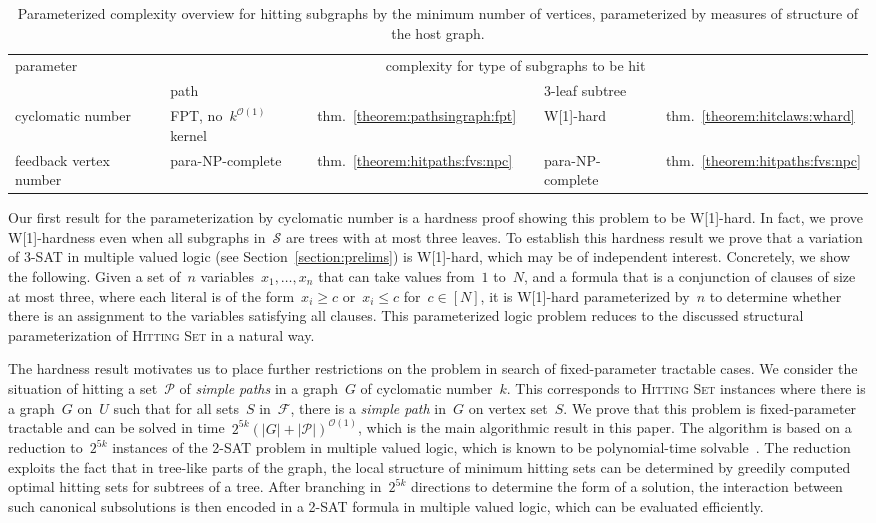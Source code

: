 \let\accentvec\vec  \documentclass{llncs}
\newcommand{\Oh}{{\mathcal{O}}}
\renewcommand{\S}{\ensuremath{\mathcal{S}}\xspace}
\renewcommand{\P}{\ensuremath{\mathcal{P}}\xspace}
\newcommand{\F}{\ensuremath{\mathcal{F}}\xspace}
\newcommand{\HittingSet}{\textsc{Hitting Set}\xspace}
\begin{document}
\begin{table}[t]
	\caption{Parameterized complexity overview for hitting subgraphs by the minimum number of vertices, parameterized by measures of structure of the host graph. }
	\centering
{
\begin{tabular}{@{}llllll@{}}
\toprule
parameter & \multicolumn{5}{c}{complexity for type of subgraphs to be hit} \\ 
\cmidrule{2-6}
& \multicolumn{2}{l}{path} & \phantom{abc} & \multicolumn{2}{l}{3-leaf subtree} \\ 
\midrule
cyclomatic number & FPT, no~$k^{\Oh(1)}$ kernel & thm.~\ref{theorem:pathsingraph:fpt} & & W[1]-hard & thm.~\ref{theorem:hitclaws:whard} \\
feedback vertex number & para-NP-complete & thm.~\ref{theorem:hitpaths:fvs:npc} & & para-NP-complete & thm.~\ref{theorem:hitpaths:fvs:npc} \\
\bottomrule
\end{tabular}
\label{table:summary}
}
\end{table}

Our first result for the parameterization by cyclomatic number is a hardness proof showing this problem to be W[1]-hard. In fact, we prove W[1]-hardness even when all subgraphs in~$\S$ are trees with at most three leaves. To establish this hardness result we prove that a variation of 3-SAT in multiple valued logic (see Section~\ref{section:prelims}) is W[1]-hard, which may be of independent interest. Concretely, we show the following. Given a set of~$n$ variables~$x_1, \ldots, x_n$ that can take values from~$1$ to~$N$, and a formula that is a conjunction of clauses of size at most three, where each literal is of the form~$x_i \geq c$ or~$x_i \leq c$ for~$c \in [N]$, it is W[1]-hard parameterized by~$n$ to determine whether there is an assignment to the variables satisfying all clauses. This parameterized logic problem reduces to the discussed structural parameterization of \HittingSet in a natural way.

The hardness result motivates us to place further restrictions on the problem in search of fixed-parameter tractable cases. We consider the situation of hitting a set~$\P$ of \emph{simple paths} in a graph~$G$ of cyclomatic number~$k$. This corresponds to \HittingSet instances where there is a graph~$G$ on~$U$ such that for all sets~$S$ in~$\F$, there is a \emph{simple path} in~$G$ on vertex set~$S$. We prove that this problem is fixed-parameter tractable and can be solved in time~$2^{5k} (|G| + |\P|)^{\Oh(1)}$, which is the main algorithmic result in this paper. The algorithm is based on a reduction to~$2^{5k}$ instances of the 2-SAT problem in multiple valued logic, which is known to be polynomial-time solvable~\cite{BejarHM01,Manya00}. The reduction exploits the fact that in tree-like parts of the graph, the local structure of minimum hitting sets can be determined by greedily computed optimal hitting sets for subtrees of a tree. After branching in~$2^{5k}$ directions to determine the form of a solution, the interaction between such canonical subsolutions is then encoded in a 2-SAT formula in multiple valued logic, which can be evaluated efficiently.
\end{document}
